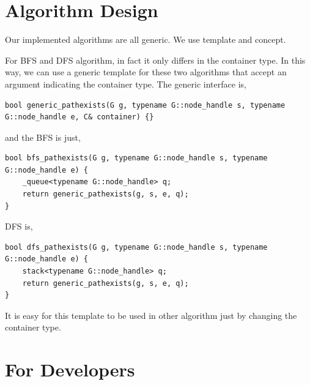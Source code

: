 \documentclass[]{article}
\begin{document}
\section{Algorithm Design}
Our implemented algorithms are all generic. We use template and concept. 

For BFS and DFS algorithm, in fact it only differs in the container type. In this way, we can use a generic template for these two algorithms that accept an argument indicating the container type.
The generic interface is,
\begin{lstlisting}
bool generic_pathexists(G g, typename G::node_handle s, typename 
G::node_handle e, C& container) {}

\end{lstlisting} 
and the BFS is just,
\begin{lstlisting}
bool bfs_pathexists(G g, typename G::node_handle s, typename 
G::node_handle e) {
    _queue<typename G::node_handle> q;
    return generic_pathexists(g, s, e, q);
}
\end{lstlisting}
DFS is,
\begin{lstlisting}
bool dfs_pathexists(G g, typename G::node_handle s, typename 
G::node_handle e) {
    stack<typename G::node_handle> q;
    return generic_pathexists(g, s, e, q);
}
\end{lstlisting}
It is easy for this template to be used in other algorithm just by changing the container type. 


\section{For Developers}
\end{document}
